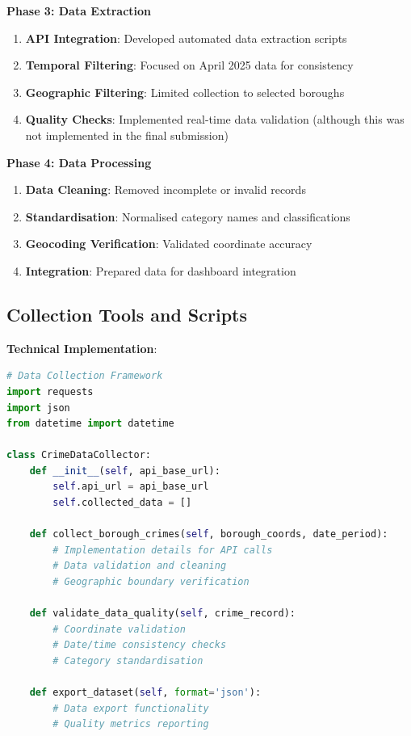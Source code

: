 \documentclass[12pt,a4paper]{article}
\begin{document}
\textbf{Phase 3: Data Extraction}
\begin{enumerate}
    \item \textbf{API Integration}: Developed automated data extraction scripts
    \item \textbf{Temporal Filtering}: Focused on April 2025 data for consistency
    \item \textbf{Geographic Filtering}: Limited collection to selected boroughs
    \item \textbf{Quality Checks}: Implemented real-time data validation (although this was not implemented in the final submission)
\end{enumerate}

\textbf{Phase 4: Data Processing}
\begin{enumerate}
    \item \textbf{Data Cleaning}: Removed incomplete or invalid records
    \item \textbf{Standardisation}: Normalised category names and classifications
    \item \textbf{Geocoding Verification}: Validated coordinate accuracy
    \item \textbf{Integration}: Prepared data for dashboard integration
\end{enumerate}

\subsection{Collection Tools and Scripts}

\textbf{Technical Implementation}:
\begin{lstlisting}[language=Python, caption=Data Collection Framework]
# Data Collection Framework
import requests
import json
from datetime import datetime

class CrimeDataCollector:
    def __init__(self, api_base_url):
        self.api_url = api_base_url
        self.collected_data = []
    
    def collect_borough_crimes(self, borough_coords, date_period):
        # Implementation details for API calls
        # Data validation and cleaning
        # Geographic boundary verification
        
    def validate_data_quality(self, crime_record):
        # Coordinate validation
        # Date/time consistency checks
        # Category standardisation
        
    def export_dataset(self, format='json'):
        # Data export functionality
        # Quality metrics reporting
\end{lstlisting}
\end{document}
